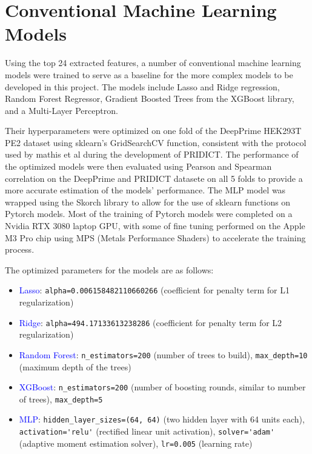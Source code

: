 \section{Conventional Machine Learning Models}
\label{sec:conventional-ml}

Using the top 24 extracted features, a number of conventional machine learning models were trained to serve as a baseline for the more complex models to be developed in this project. The models include Lasso and Ridge regression, Random Forest Regressor, Gradient Boosted Trees from the XGBoost library, and a Multi-Layer Perceptron.

Their hyperparameters were optimized on one fold of the DeepPrime HEK293T PE2 dataset using sklearn's GridSearchCV function, consistent with the protocol used by mathis et al during the development of PRIDICT. The performance of the optimized models were then evaluated using Pearson and Spearman correlation on the DeepPrime and PRIDICT datasete on all 5 folds to provide a more accurate estimation of the models' performance. The MLP model was wrapped using the Skorch library to allow for the use of sklearn functions on Pytorch models. 
Most of the training of Pytorch models were completed on a Nvidia RTX 3080 laptop GPU, with some of fine tuning performed on the Apple M3 Pro chip using MPS (Metals Performance Shaders) to accelerate the training process.

The optimized parameters for the models are as follows:

\begin{itemize}[itemsep=-0mm]
    \item \textcolor{blue}{Lasso}: \verb|alpha=0.006158482110660266| (coefficient for penalty term for L1 regularization)
    \item \textcolor{blue}{Ridge}: \verb|alpha=494.17133613238286| (coefficient for penalty term for L2 regularization)
    \item \textcolor{blue}{Random Forest}: \verb|n_estimators=200| (number of trees to build), \verb|max_depth=10| (maximum depth of the trees)
    \item \textcolor{blue}{XGBoost}: \verb|n_estimators=200| (number of boosting rounds, similar to number of trees), \verb|max_depth=5| 
    \item \textcolor{blue}{MLP}: \verb|hidden_layer_sizes=(64, 64)| (two hidden layer with 64 units each), \verb|activation='relu'| (rectified linear unit activation), \verb|solver='adam'| (adaptive moment estimation solver), \verb|lr=0.005| (learning rate)
\end{itemize}

